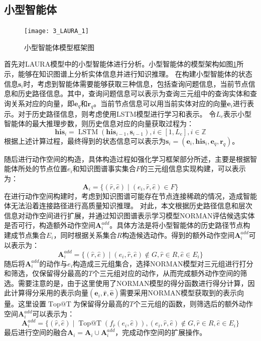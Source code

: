 \documentclass[algorithmlist, AutoFakeBold, AutoFakeSlant, figurelist, tablelist, nomlist, engineering, openany]{seuthesix} %
\begin{document}
\subsection{小型智能体}
\begin{figure}
  \centering
  \texttt{[image: 3\_LAURA\_1]}
  \caption{小型智能体模型框架图}
  \label{3_LAURA_1}
\end{figure}
首先对LAURA模型中的小型智能体进行分析。小型智能体的模型架构如图\ref{3_LAURA_1}所示，能够在知识图谱上分析实体信息并进行知识推理。
在构建小型智能体的状态信息$\bm{s}_i$时，考虑到智能体需要能够获取三种信息，包括查询问题信息，当前节点信息和历史路径信息。其中，查询问题信息可以表示为查询三元组中的查询实体和查询关系对应的向量，即$\bm{e}_q$和$\bm{r}_q$。当前节点信息可以用当前实体对应的向量$\bm{e}_i$进行表示。对于历史路径信息，则考虑使用LSTM模型进行学习和表示。
令$L_e$表示小型智能体的最大推理步数，则历史信息对应的向量获取过程为：
\begin{equation}
  \bm{his}_i=\operatorname{LSTM}\left(\bm{his}_{i - 1}, \bm{s}_{i - 1}\right), i \in [1, L_e], i \in \mathbb{Z}
  \label{equation_HistoryLSTM}
\end{equation}
根据上述计算过程，最终得到的状态信息可以表示为$\bm{s}_i = (\bm{e}_i, \bm{his}_i, \bm{e}_q, \bm{r}_q)$。

随后进行动作空间的构造，具体构造过程如强化学习框架部分所述，主要是根据智能体所处的节点位置$e_i$和知识图谱事实集合$F$的三元组信息实现构建，可以表示为：
\begin{equation}
  \bm{A}_i = \{(\hat{r}, \hat{e}) \mid (e_i, \hat{r}, \hat{e}) \in F\}
  \label{base_1}
\end{equation}
在进行动作空间构建时，考虑到知识图谱可能存在节点连接稀疏的情况，造成智能体无法沿着连接路径进行高质量知识推理。
对此，本文根据历史路径信息和层次信息对动作空间进行扩展，并通过知识图谱表示学习模型NORMAN评估候选实体是否可行，构造额外动作空间$\bm{A}_{i}^{add}$。具体方法是将小型智能体的历史路径节点构建成节点集合$E_i$，同时根据关系集合$R$构造候选动作。得到的额外动作空间$\bm{A}_{i}^{add}$可以表示为：
\begin{equation}
  \bm{A}_{i}^{add} = \{(\hat{r}, \hat{e}) \mid (e_i, \hat{r}, \hat{e}) \notin G, \hat{r} \in R, \hat{e} \in E_i \}
  \label{extra_1}
\end{equation}
随后将$\bm{A}_{i}^{add}$的动作与$e_i$构造成三元组集合，选择NORMAN模型对三元组进行打分和筛选，仅保留得分最高的$T$个三元组对应的动作，从而完成额外动作空间的筛选。需要注意的是，由于这里使用了NORMAN模型的得分函数进行得分计算，因此计算得分采用的表示向量$(\bm{e}_i, \bm{\hat{r}}, \bm{\hat{e}})$需要采用NORMAN模型获取到的表示向量。这里设置$\operatorname{Top@T}$为保留得分最高的$T$个三元组的函数，则筛选后的额外动作空间$\bm{A}_{i}^{add}$可以表示为：
\begin{equation}
  \bm{A}_i^{add} = \{(\hat{r}, \hat{e}) \mid \operatorname{Top@T}(f_{\hat{r}}(e_i, \hat{e})), (e_i, \hat{r}, \hat{e}) \notin G, \hat{r} \in R, \hat{e} \in E_i \}
\end{equation}
最后进行空间的融合$\bm{A}_i = \bm{A}_i \cup \bm{A}_{i}^{add} $，完成动作空间的扩展操作。
\end{document}

